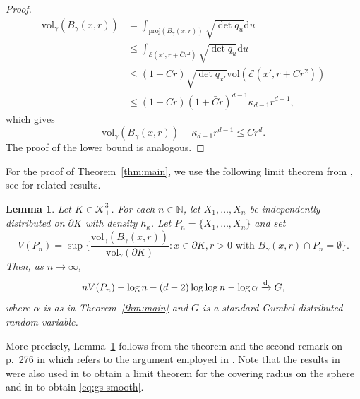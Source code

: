 \documentclass[a4paper,12pt,reqno]{amsart}
\newtheorem{lem}[thm]{Lemma}
\theoremstyle{definition}
\newcommand{\IN}{\mathbb{N}}
\newcommand{\cK}{\mathcal{K}}
\newcommand{\vol}{\mathrm{vol}}
\newcommand{\proj}{\mathrm{proj}}
\newcommand{\dd}{\mathrm{d}}
\begin{document}
\begin{proof}
\begin{align*}
\vol_{\gamma}(B_{\gamma}(x,r))	
&=\int_{\proj(B_{\gamma}(x,r))}\sqrt{\det q_u}\dd u\\
&\le \int_{\mathcal{E}(x',r+\bar{C}r^2)}\sqrt{\det q_{u}}\dd u\\
&\le (1+C r)\sqrt{\det q_{x'}}\vol(\mathcal{E}(x',r+\bar{C}r^2))\\
&\le (1+C r)(1+\bar{C}r)^{d-1}\kappa_{d-1}r^{d-1},
\end{align*}
which gives 
\[
\vol_{\gamma}(B_{\gamma}(x,r))-\kappa_{d-1}r^{d-1}\le C r^d.
\]
The proof of the lower bound is analogous.
\end{proof}

For the proof of Theorem~\ref{thm:main}, we use the following limit theorem from \cite{Jan87}, see \cite{Jan86,Pen23} for related results. 

\begin{lem}\label{lem:janson}
Let $K\in \cK^3_+$. For each $n\in \IN$, let $X_1,\dots,X_n$ be independently distributed on $\partial K$ with density $h_{\kappa}$. Let $P_n=\{X_1,\dots,X_n\}$ and set 
\[
V(P_n)
=\sup\Big\{\frac{\vol_{\gamma}(B_{\gamma}(x,r))}{\vol_{\gamma}(\partial K)}\colon x\in \partial K, r>0 \text{ with } B_{\gamma}(x,r)\cap P_n=\emptyset\Big\}.
\]
Then, as $n\to \infty$, 
\begin{equation}
	\label{eq:V-gumbel}
nV(P_n)-\log n -(d-2)\log\log n-\log \alpha 
\xrightarrow[]{\rm d}
G,
\end{equation}
where $\alpha$ is as in Theorem~\ref{thm:main} and $G$ is a standard Gumbel distributed random variable.
\end{lem}

More precisely, Lemma~\ref{lem:janson} follows from the theorem and the second remark on p.~276  in \cite{Jan87} which refers to the argument employed in \cite[Section~8]{Jan86}.  Note that the results in \cite{Jan86,Jan87} were also used in \cite{Ser23} to obtain a limit theorem for the covering radius on the sphere and in \cite{GS96} to obtain \eqref{eq:gs-smooth}. 
\end{document}
